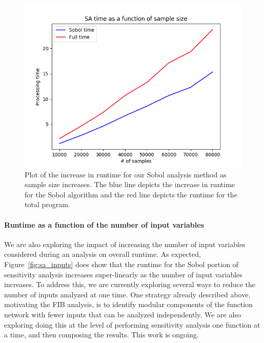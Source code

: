 \documentclass[article, 12pt, oneside]{memoir}
\begin{document}
\begin{figure}
\centering
\includegraphics{figs/sa_samples_vs_runtime.png}
\caption{Plot of the increase in runtime for our Sobol analysis method
as sample size increases. The blue line depicts the increase in runtime
for the Sobol algorithm and the red line depicts the runtime for the
total program.\label{fig:sa_samples}}
\end{figure}


\hypertarget{runtime-as-a-function-of-the-number-of-input-variables}{%
\paragraph{Runtime as a function of the number of input
variables}\label{runtime-as-a-function-of-the-number-of-input-variables}}

We are also exploring the impact of increasing the number of input
variables considered during an analysis on overall runtime. As expected,
Figure~\ref{fig:sa_inputs} does show that the runtime for the Sobol portion of
sensitivity analysis increases super-linearly as the number of input
variables increases. To address this, we are currently exploring several
ways to reduce the number of inputs analyzed at one time. One strategy
already described above, motivating the FIB analysis, is to identify
modular components of the function network with fewer inputs that can be
analyzed independently. We are also exploring doing this at the level of
performing sensitivity analysis one function at a time, and then
composing the results. This work is ongoing.
\end{document}
